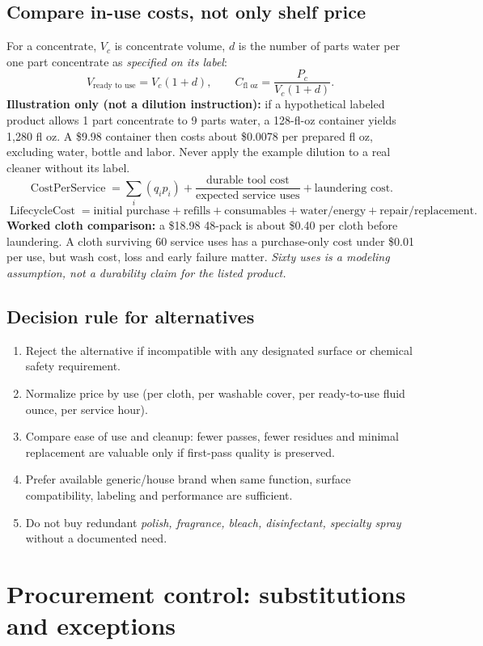 \documentclass[10pt,letterpaper,oneside]{article}
\begin{document}
\subsection{Compare in-use costs, not only shelf price}
For a concentrate, \(V_c\) is concentrate volume, \(d\) is the number of parts water per one part concentrate as \emph{specified on its label}:
\[
V_{\text{ready to use}} = V_c(1+d),\qquad
C_{\text{fl oz}} = \frac{P_c}{V_c(1+d)}.
\]
\textbf{Illustration only (not a dilution instruction):} if a hypothetical labeled product allows 1 part concentrate to 9 parts water, a 128-fl-oz container yields 1,280 fl oz. A \$9.98 container then costs about \$0.0078 per prepared fl oz, excluding water, bottle and labor. Never apply the example dilution to a real cleaner without its label.
\[
\operatorname{CostPerService} = \sum_i (q_i p_i) + \frac{\text{durable tool cost}}{\text{expected service uses}} + \text{laundering cost}.
\]
\[
\operatorname{LifecycleCost}=\text{initial purchase}+\text{refills}+\text{consumables}+\text{water/energy}+\text{repair/replacement}.
\]
\textbf{Worked cloth comparison:} a \$18.98 48-pack is about \$0.40 per cloth before laundering. A cloth surviving 60 service uses has a purchase-only cost under \$0.01 per use, but wash cost, loss and early failure matter. \emph{Sixty uses is a modeling assumption, not a durability claim for the listed product.}
\subsection{Decision rule for alternatives}
\begin{enumerate}
\item Reject the alternative if incompatible with any designated surface or chemical safety requirement.
\item Normalize price by use (per cloth, per washable cover, per ready-to-use fluid ounce, per service hour).
\item Compare ease of use and cleanup: fewer passes, fewer residues and minimal replacement are valuable only if first-pass quality is preserved.
\item Prefer available generic/house brand when same function, surface compatibility, labeling and performance are sufficient.
\item Do not buy redundant \emph{polish, fragrance, bleach, disinfectant, specialty spray} without a documented need.
\end{enumerate}
\section{Procurement control: substitutions and exceptions}
\end{document}

